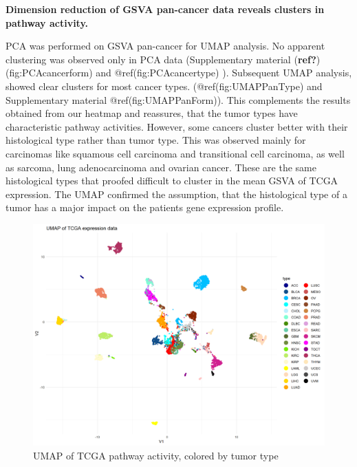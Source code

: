 \documentclass[
  parskip,
  oneside]{scrreprt}
\begin{document}
\textbf{Dimension reduction of GSVA pan-cancer data reveals clusters in
pathway activity.}

PCA was performed on GSVA pan-cancer for UMAP analysis. No apparent
clustering was observed only in PCA data (Supplementary material
(\textbf{ref?})(fig:PCAcancerform) and @ref(fig:PCAcancertype) ).
Subsequent UMAP analysis, showed clear clusters for most cancer types.
(@ref(fig:UMAPPanType) and Supplementary material
@ref(fig:UMAPPanForm)). This complements the results obtained from our
heatmap and reassures, that the tumor types have characteristic pathway
activities. However, some cancers cluster better with their histological
type rather than tumor type. This was observed mainly for carcinomas
like squamous cell carcinoma and transitional cell carcinoma, as well as
sarcoma, lung adenocarcinoma and ovarian cancer. These are the same
histological types that proofed difficult to cluster in the mean GSVA of
TCGA expression. The UMAP confirmed the assumption, that the
histological type of a tumor has a major impact on the patients gene
expression profile.

\begin{figure}

{\centering \includegraphics[width=0.8\linewidth]{figures/Pan Cancer UMAP} 

}

\caption{UMAP of TCGA pathway activity, colored by tumor type}\label{fig:UMAPPanType}
\end{figure}
\end{document}
